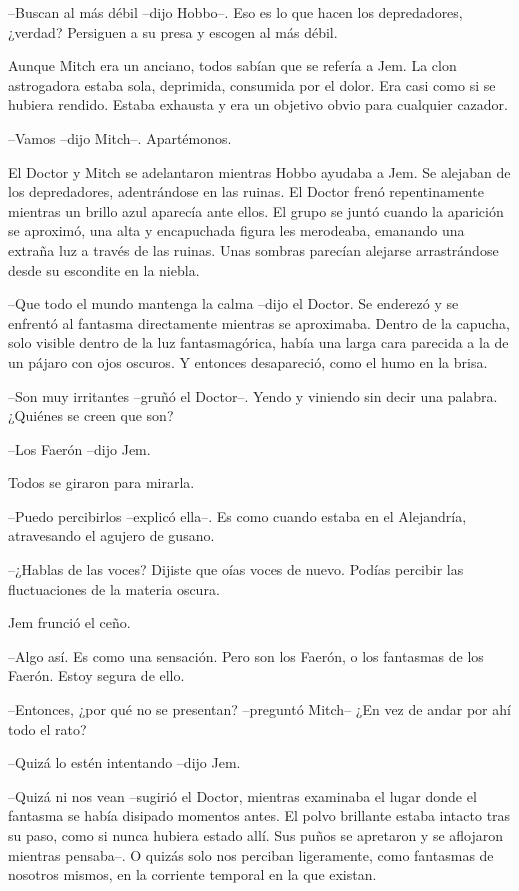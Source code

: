{--Buscan al más débil --dijo Hobbo--. Eso es lo que hacen los
depredadores, ¿verdad? Persiguen a su presa y escogen al más débil.}

{Aunque Mitch era un anciano, todos sabían que se refería a Jem. La clon
 astrogadora estaba sola, deprimida, consumida por el dolor. Era casi
 como si se hubiera rendido. Estaba exhausta y era un objetivo obvio para
cualquier cazador.}

{--Vamos --dijo Mitch--. Apartémonos.}

{El Doctor y Mitch se adelantaron mientras Hobbo ayudaba a Jem. Se
 alejaban de los depredadores, adentrándose en las ruinas. El Doctor
 frenó repentinamente mientras un brillo azul aparecía ante ellos. El
 grupo se juntó cuando la aparición se aproximó, una alta y encapuchada
 figura les merodeaba, emanando una extraña luz a través de las ruinas.
 Unas sombras parecían alejarse arrastrándose desde su escondite en la
niebla.}

{--Que todo el mundo mantenga la calma --dijo el Doctor. Se enderezó y se
 enfrentó al fantasma directamente mientras se aproximaba. Dentro de la
 capucha, solo visible dentro de la luz fantasmagórica, había una larga
 cara parecida a la de un pájaro con ojos oscuros. Y entonces
desapareció, como el humo en la brisa.}

{--Son muy irritantes --gruñó el Doctor--. Yendo y viniendo sin decir una
palabra. ¿Quiénes se creen que son?}

{--Los Faerón --dijo Jem.}

{Todos se giraron para mirarla.}

{--Puedo percibirlos --explicó ella--. Es como cuando estaba en el
Alejandría, atravesando el agujero de gusano.}

{--¿Hablas de las voces? Dijiste que oías voces de nuevo. Podías percibir
las fluctuaciones de la materia oscura.}

{Jem frunció el ceño.}

{--Algo así. Es como una sensación. Pero son los Faerón, o los fantasmas
de los Faerón. Estoy segura de ello.}

{--Entonces, ¿por qué no se presentan? --preguntó Mitch-- ¿En vez de
andar por ahí todo el rato?}

{--Quizá lo estén intentando --dijo Jem.}

{--Quizá ni nos vean --sugirió el Doctor, mientras examinaba el lugar
 donde el fantasma se había disipado momentos antes. El polvo brillante
 estaba intacto tras su paso, como si nunca hubiera estado allí. Sus
 puños se apretaron y se aflojaron mientras pensaba--. O quizás solo nos
 perciban ligeramente, como fantasmas de nosotros mismos, en la corriente
temporal en la que existan.}

